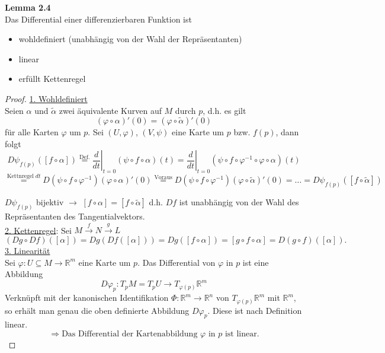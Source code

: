 \documentclass[fleqn, 12pt, letterpaper]{article}
\newcommand{\txt}[1]{\text{#1}}
\begin{document}
\textbf{Lemma 2.4}\\
Das Differential einer differenzierbaren Funktion ist
\begin{itemize}
    \item wohldefiniert (unabhängig von der Wahl der Repräsentanten)
    \item linear
    \item erfüllt Kettenregel
\end{itemize}
\begin{proof}
  \underline{1. Wohldefiniert}\\
        Seien \( \alpha \) und \( \tilde{\alpha} \) zwei äquivalente Kurven auf \( M \) durch \( p \), d.h. es gilt 
        \[(\varphi \circ \alpha)'(0) = (\varphi \circ \tilde{\alpha})'(0)\]
        für alle Karten \( \varphi \) um \( p \). Sei \((U, \varphi)\), \((V, \psi)\) eine Karte um \( p \) bzw. \( f(p) \), dann folgt
        \[
        D{\psi_{f(p)}}( [f \circ \alpha]) \overset{\txt{Def.}}{=} \left. \frac{d}{dt} \right|_{t=0} (\psi \circ f \circ \alpha)(t) = \left. \frac{d}{dt} \right|_{t=0} (\psi \circ f \circ  \varphi^{-1} \circ \varphi \circ \alpha)(t)
        \]
        \[ \overset{\txt{Kettnregel}\;dt}{=} D(\psi \circ f \circ \varphi^{-1})(\varphi \circ \alpha)'(0) \overset{\txt{Voraus}}{=} D(\psi \circ f \circ \varphi^{-1})(\varphi \circ \tilde{\alpha})'(0) =\dots=  D{\psi_{f(p)}}( [f \circ \tilde{\alpha}])\]
        
        \( D{\psi_{f(p)}} \) bijektiv \(\rightarrow\) $[f \circ \alpha]=[f \circ \tilde{\alpha}]$
        d.h. \( Df \) ist unabhängig von der Wahl des Repräsentanten des Tangentialvektors.\\

        \underline{2. Kettenregel}: Sei $M\overset{f}{\rightarrow}N\overset{g}{\rightarrow}L$
     \[
(Dg \circ Df)([\alpha]) = Dg(Df([\alpha])) = Dg([f \circ \alpha]) = [g \circ f \circ \alpha] = D(g \circ f)([\alpha]).
\]
        \underline{3. Linearität}\\
        Sei \(\varphi : U \subseteq M \to \mathbb{R}^m\) eine Karte um \( p \). Das Differential von \(\varphi\) in \(p\) ist eine Abbildung
\[
D\varphi_p: T_p M=T_pU \to T_{\varphi(p)} \mathbb{R}^m
\]
Verknüpft mit der kanonischen Identifikation \(\Phi: \mathbb{R}^m\to \mathbb{R}^n\) von \(T_{\varphi(p)} \mathbb{R}^m\) mit \(\mathbb{R}^m\), so erhält man genau die oben definierte Abbildung \(D\varphi_p\). Diese ist nach Definition linear.
\[
\Rightarrow \text{Das Differential der Kartenabbildung } \varphi \text{ in } p \text{ ist linear.}
\]


\end{proof}
\end{document}
